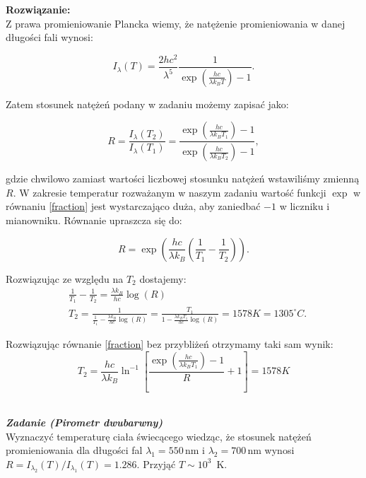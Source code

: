 \documentclass[11pt,a4paper]{article}
\newcounter{zadanie}\newcommand{\zadanie}[1][]{\addtocounter{zadanie}{1} ~\\  {\bf \emph{Zadanie \arabic{zadanie} #1 }} \\}
\begin{document}
\vskip 10pt
\textbf{Rozwiązanie:}\\
Z prawa promieniowanie Plancka wiemy, że natężenie promieniowania w danej długości fali wynosi:

\begin{equation}
I_\lambda(T) = \frac{2 h c^2}{\lambda^5} \frac{1}{\exp\left(\frac{h c}{\lambda k_B T}\right)-1}.
\label{planck}
\end{equation}

Zatem stosunek natężeń podany w zadaniu możemy zapisać jako:

\begin{equation}
  R=\frac{I_\lambda(T_2)}{I_\lambda(T_1)} =
  \frac{\exp\left(\frac{h c}{\lambda k_B T_1}\right)-1}{\exp\left(\frac{h c}{\lambda k_B T_2}\right)-1},\label{fraction}
\end{equation}

gdzie chwilowo zamiast wartości liczbowej stosunku natężeń wstawiliśmy zmienną $R$. W zakresie temperatur rozważanym w naszym zadaniu wartość funkcji $\exp$ w równaniu \eqref{fraction} jest wystarczająco duża, aby zaniedbać $-1$ w liczniku i mianowniku. Równanie upraszcza się do:

\begin{equation}
R = \exp\left(\frac{h c}{\lambda k_B}\left( \frac{1}{T_1}-\frac{1}{T_2}\right)\right).
\end{equation}

Rozwiązując ze względu na $T_2$ dostajemy:
\begin{align}
&\frac{1}{T_1}-\frac{1}{T_2} = \frac{\lambda k_B}{h c} \log(R)\\
  &T_2 = \frac{1}{\frac{1}{T_1} - \frac{\lambda k_B}{h c} \log(R)} =
  \frac{T_1}{1-\frac{\lambda k_B T_1}{h c} \log(R)} = 1578 K = 1305 ^\circ C.
\end{align}

Rozwiązując równanie \eqref{fraction} bez przybliżeń otrzymamy taki sam wynik:
\begin{equation}
T_2 = \frac{hc}{\lambda k_{B}} \ln^{-1}\left[\frac{\exp\left(\frac{h c}{\lambda k_B T_1}\right)-1}{R}+1 \right] = 1578 K
\end{equation}

\newpage

\zadanie [(Pirometr dwubarwny)]
Wyznaczyć temperaturę ciała świecącego wiedząc, że stosunek natężeń promieniowania dla długości fal
$\lambda_1=550$\,nm i $\lambda_2=700$\,nm wynosi $R=I_{\lambda_2}(T)/I_{\lambda_1}(T) =1.286$.
Przyjąć $T \sim 10^{3}$~K.\\
\end{document}
